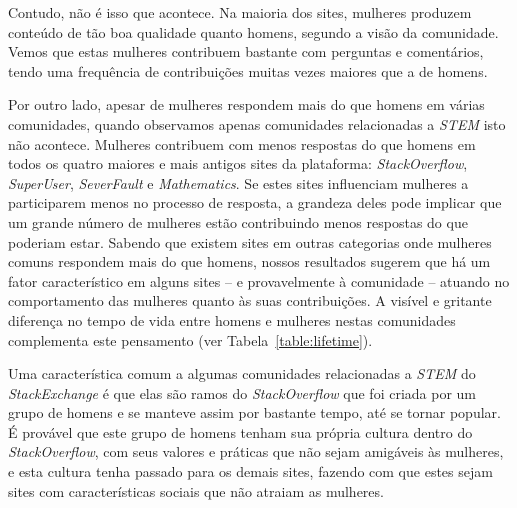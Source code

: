 Contudo, não é isso que acontece. Na maioria dos sites, mulheres produzem conteúdo de tão boa qualidade quanto homens, segundo a visão da comunidade. Vemos que estas mulheres contribuem bastante com perguntas e comentários, tendo uma frequência de contribuições muitas vezes maiores que a de homens. 



Por outro lado, apesar de mulheres respondem mais do que homens em várias comunidades, quando observamos apenas comunidades relacionadas a \emph{STEM} isto não acontece. Mulheres contribuem com menos respostas do que homens em todos os quatro maiores e mais antigos sites da plataforma: \emph{StackOverflow}, \emph{SuperUser}, \emph{SeverFault} e \emph{Mathematics}. Se estes sites influenciam mulheres a participarem menos no processo de resposta, a grandeza deles pode implicar que um grande número de mulheres estão contribuindo menos respostas do que poderiam estar. Sabendo que existem sites em outras categorias onde mulheres comuns respondem mais do que homens, nossos resultados sugerem que há um fator característico em alguns sites -- e provavelmente à comunidade -- atuando no comportamento das mulheres quanto às suas contribuições. A visível e gritante diferença no tempo de vida entre homens e mulheres nestas comunidades complementa este pensamento (ver Tabela~\ref{table:lifetime}).

Uma característica comum a algumas comunidades relacionadas a \emph{STEM} do \emph{StackExchange} é que elas são ramos do \emph{StackOverflow} que foi criada por um grupo de homens e se manteve assim por bastante tempo, até se tornar popular. É provável que este grupo de homens tenham sua própria cultura dentro do \emph{StackOverflow}, com seus valores e práticas que não sejam amigáveis às mulheres, e esta cultura tenha passado para os demais sites, fazendo com que estes sejam sites com características sociais que não atraiam as mulheres.

